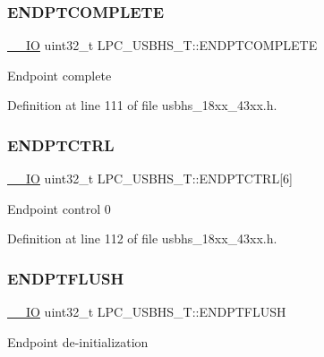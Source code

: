 \subsubsection{\texorpdfstring{E\+N\+D\+P\+T\+C\+O\+M\+P\+L\+E\+TE}{ENDPTCOMPLETE}}
{\footnotesize\ttfamily \hyperlink{core__sc300_8h_aec43007d9998a0a0e01faede4133d6be}{\+\_\+\+\_\+\+IO} uint32\+\_\+t L\+P\+C\+\_\+\+U\+S\+B\+H\+S\+\_\+\+T\+::\+E\+N\+D\+P\+T\+C\+O\+M\+P\+L\+E\+TE}

Endpoint complete 

Definition at line 111 of file usbhs\+\_\+18xx\+\_\+43xx.\+h.

\mbox{\label{struct_l_p_c___u_s_b_h_s___t_aed960a979ffa96c0a1772d3d63cad0b3}} 
\subsubsection{\texorpdfstring{E\+N\+D\+P\+T\+C\+T\+RL}{ENDPTCTRL}}
{\footnotesize\ttfamily \hyperlink{core__sc300_8h_aec43007d9998a0a0e01faede4133d6be}{\+\_\+\+\_\+\+IO} uint32\+\_\+t L\+P\+C\+\_\+\+U\+S\+B\+H\+S\+\_\+\+T\+::\+E\+N\+D\+P\+T\+C\+T\+RL\mbox{[}6\mbox{]}}

Endpoint control 0 

Definition at line 112 of file usbhs\+\_\+18xx\+\_\+43xx.\+h.

\mbox{\label{struct_l_p_c___u_s_b_h_s___t_afe49f090c82c8ec68d34ad42ab384739}} 
\subsubsection{\texorpdfstring{E\+N\+D\+P\+T\+F\+L\+U\+SH}{ENDPTFLUSH}}
{\footnotesize\ttfamily \hyperlink{core__sc300_8h_aec43007d9998a0a0e01faede4133d6be}{\+\_\+\+\_\+\+IO} uint32\+\_\+t L\+P\+C\+\_\+\+U\+S\+B\+H\+S\+\_\+\+T\+::\+E\+N\+D\+P\+T\+F\+L\+U\+SH}

Endpoint de-\/initialization 

